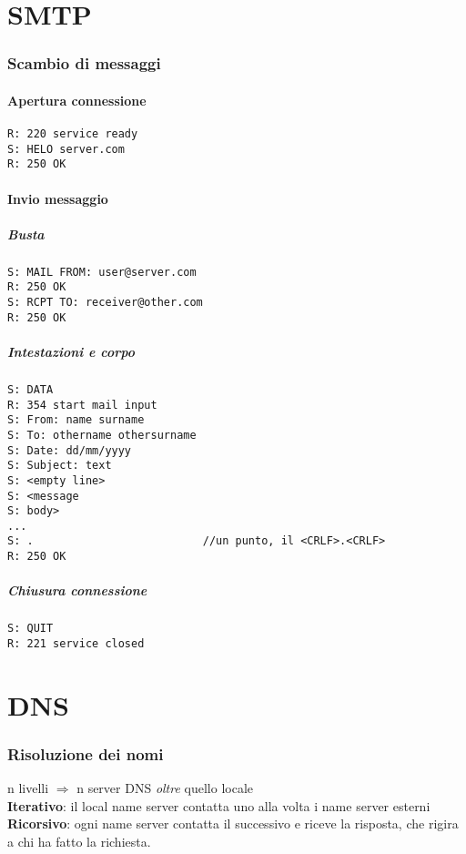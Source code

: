 \documentclass[12pt]{article}
\begin{document}
\section{SMTP}
\subsubsection{Scambio di messaggi}
\paragraph{Apertura connessione}
\begin{verbatim}
R: 220 service ready
S: HELO server.com
R: 250 OK
\end{verbatim}
\paragraph{Invio messaggio}
\subparagraph{Busta}
\begin{verbatim}
S: MAIL FROM: user@server.com
R: 250 OK
S: RCPT TO: receiver@other.com
R: 250 OK
\end{verbatim}
\subparagraph{Intestazioni e corpo}
\begin{verbatim}
S: DATA
R: 354 start mail input
S: From: name surname
S: To: othername othersurname
S: Date: dd/mm/yyyy
S: Subject: text
S: <empty line>
S: <message
S: body>
...
S: .                          //un punto, il <CRLF>.<CRLF>
R: 250 OK
\end{verbatim}
\subparagraph{Chiusura connessione}
\begin{verbatim}
S: QUIT
R: 221 service closed
\end{verbatim}
\section{DNS}
\subsubsection{Risoluzione dei nomi}
n livelli $\Rightarrow$ n server DNS \textit{oltre} quello locale\\
\textbf{Iterativo}: il local name server contatta uno alla volta i name server esterni\\
\textbf{Ricorsivo}: ogni name server contatta il successivo e riceve la risposta, che rigira a chi ha fatto la richiesta.
\end{document}
